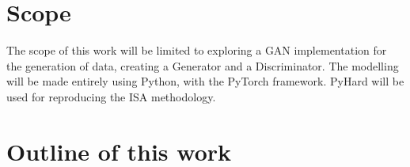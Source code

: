 \section{Scope}

The scope of this work will be limited to exploring a GAN implementation for the generation of data, creating a Generator and a Discriminator.  The modelling will be made entirely using Python, with the PyTorch \cite{paszke2019pytorch} framework. PyHard \cite{Lorena2022} will be used for reproducing the ISA methodology.




\section{Outline of this work}


